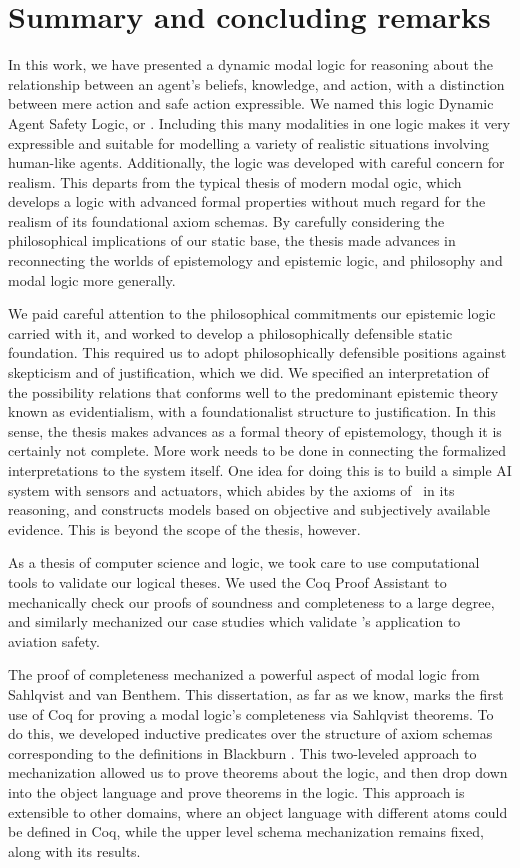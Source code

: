 \chapter{Summary and concluding remarks}
	\label{CH_summary}

In this work, we have presented a dynamic modal logic for reasoning about the relationship between an agent's beliefs, knowledge, and action, with a distinction between mere action and safe action expressible. We named this logic Dynamic Agent Safety Logic, or \DASL. Including this many modalities in one logic makes it very expressible and suitable for modelling a variety of realistic situations involving human-like agents. Additionally, the logic was developed with careful concern for realism. This departs from the typical thesis of modern modal ogic, which develops a logic with advanced formal properties without much regard for the realism of its foundational axiom schemas. By carefully considering the philosophical implications of our static base, the thesis made advances in reconnecting the worlds of epistemology and epistemic logic, and philosophy and modal logic more generally.

We paid careful attention to the philosophical commitments our epistemic logic carried with it, and worked to develop a philosophically defensible static foundation. This required us to adopt philosophically defensible positions against skepticism and of justification, which we did. We specified an interpretation of the possibility relations that conforms well to the predominant epistemic theory known as evidentialism, with a foundationalist structure to justification. In this sense, the thesis makes advances as a formal theory of epistemology, though it is certainly not complete. More work needs to be done in connecting the formalized interpretations to the system itself. One idea for doing this is to build a simple AI system with sensors and actuators, which abides by the axioms of \DASL\ in its reasoning, and constructs models based on objective and subjectively available evidence. This is beyond the scope of the thesis, however.

As a thesis of computer science and logic, we took care to use computational tools to validate our logical theses. We used the Coq Proof Assistant to mechanically check our proofs of soundness and completeness to a large degree, and similarly mechanized our case studies which validate \DASL's application to aviation safety. 

The proof of completeness mechanized a powerful aspect of modal logic from Sahlqvist and van Benthem. This dissertation, as far as we know, marks the first use of Coq for proving a modal logic's completeness via Sahlqvist theorems. To do this, we developed inductive predicates over the structure of axiom schemas corresponding to the definitions in Blackburn \etal\cite{modal}. This two-leveled approach to mechanization allowed us to prove theorems about the logic, and then drop down into the object language and prove theorems in the logic. This approach is extensible to other domains, where an object language with different atoms could be defined in Coq, while the upper level schema mechanization remains fixed, along with its results.

